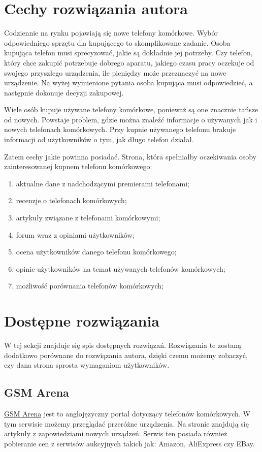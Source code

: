 \section{Cechy rozwiązania autora}
\label{ideal_solution}
Codziennie na rynku pojawiają się nowe telefony komórkowe. Wybór odpowiedniego sprzętu dla kupującego to skomplikowane zadanie. Osoba kupująca telefon musi sprecyzować, jakie są dokładnie jej potrzeby. Czy telefon, który chce zakupić potrzebuje dobrego aparatu, jakiego czasu pracy oczekuje od swojego przyszłego urządzenia, ile pieniędzy może przeznaczyć na nowe urządzenie. Na wyżej wymienione pytania osoba kupująca musi odpowiedzieć, a następnie dokonuje decyzji zakupowej.

Wiele osób kupuje używane telefony komórkowe, ponieważ są one znacznie tańsze od nowych. Powstaje problem, gdzie można znaleźć informacje o używanych jak i nowych telefonach komórkowych. Przy kupnie używanego telefonu brakuje informacji od użytkowników o tym, jak długo telefon działał.  

Zatem cechy jakie powinna posiadać. Strona, która spełniałby oczekiwania osoby zainteresowanej kupnem telefonu komórkowego:
\begin{enumerate}
    \item aktualne dane z nadchodzącymi premierami telefonami;
    \item recenzje o telefonach komórkowych;
    \item artykuły związane z telefonami komórkowymi;
    \item forum wraz z opiniami użytkowników;
    \item ocena użytkowników danego telefonu komórkowego;
    \item opinie użytkowników na temat używanych telefonów komórkowych;
    \item możliwość porównania telefonów komórkowych;
\end{enumerate}

\section{Dostępne rozwiązania}
W tej sekcji znajduje się spis dostępnych rozwiązań. Rozwiązania te zostaną dodatkowo porównane do rozwiązania autora, dzięki czemu możemy zobaczyć, czy dana strona sprosta wymaganiom użytkowników.

\subsection{GSM Arena}
\href{https://www.gsmarena.com/}{GSM Arena} \cite{gsm_arena} jest to anglojęzyczny portal dotyczący telefonów komórkowych. W tym serwisie możemy przeglądać przeróżne urządzenia. Na stronie znajdują się artykuły z zapowiedziami nowych urządzeń. Serwis ten posiada również pobieranie cen z serwisów aukcyjnych takich jak: Amazon, AliExpress czy EBay.

